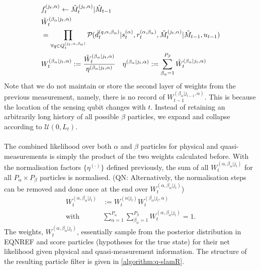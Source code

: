 \begin{align}
	&f^{( j_t, \alpha )}_{t}  \leftarrow \hat{M}_t^{(j_t, \alpha)}| \hat{M}_{t-1} \label{eqn:slam:PF:6:beta:mapupdate}\\ 
	&\tilde{W}_t^{( \beta_\alpha | j_t, \alpha)} \nonumber \\
	&= \prod_{\forall q \in Q^{( j_t, \alpha, \beta_\alpha )}_{t}} \mathcal{P}_{} (  \hat{d}^{( q, \alpha, \beta_\alpha )}_{t}|s_{ t}^{(\alpha)}, r_{ t}^{(\alpha, \beta_\alpha)}, \hat{M}_t^{(j_t, \alpha)}| \hat{M}_{t-1}, u_{t-1 } ) \label{eqn:slam:PF:7:beta:raw} \\
	&W_t^{( \beta_\alpha | j_t, \alpha)}:= \frac{\tilde{W}_t^{( \beta_\alpha | j_t, \alpha)}}{\eta^{( \beta_\alpha | j_t, \alpha)}} \quad \eta^{( \beta_\alpha | j_t, \alpha)}:= \sum_{\beta_\alpha = 1}^{P_\beta}\tilde{W}_t^{( \beta_\alpha | j_t, \alpha)} \label{eqn:slam:PF:8:beta:norm}
\end{align}	Note that we do not maintain or store the second layer of weights from the previous measurement, namely, there is no record of $W_{t-1}^{( \beta_\alpha | j_{t-1}, \alpha)}$. This is because the location of the sensing qubit changes with $t$. Instead of retaining an arbitrarily long history of all possible $\beta$ particles, we expand and collapse according to $ \mathcal{U}(0,L_t)$.\\
\\
The combined likelihood over both $\alpha$ and $\beta$ particles for physical and quasi-measurements is simply the product of the two weights calculated before.  With the normalisation factors $\{ \eta^{(\cdot)} \}$ defined previously, the sum of all $W_t^{(\alpha, \beta_\alpha | j_t)}$  for all $P_\alpha \times P_\beta$ particles is normalised. (QN: Alternatively, the normalisation steps can be removed and done once at the end over  $W_t^{(\alpha, \beta_\alpha | j_t)}$)
\begin{align}
W_t^{(\alpha, \beta_\alpha | j_t)} &:= W_t^{( \alpha | j_t)}  W_t^{( \beta_\alpha | j_t, \alpha)} \label{eqn:slam:PF:9:weights:raw} \\
\mathrm{with} \quad & \sum_{\alpha=1}^{P_\alpha} \sum_{\beta_\alpha=1}^{P_\beta}  W_t^{(\alpha, \beta_\alpha | j_t)} = 1. \label{eqn:slam:PF:10:weights:norm}
\end{align} The  weights, $W_t^{(\alpha, \beta_\alpha | j_t)}$, essentially sample from the posterior distribution in EQNREF and score particles (hypotheses for the true state) for their net likelihood given physical and quasi-measurement information. The structure of the resulting particle filter is given in \cref{algorithm:q-slamR}.

